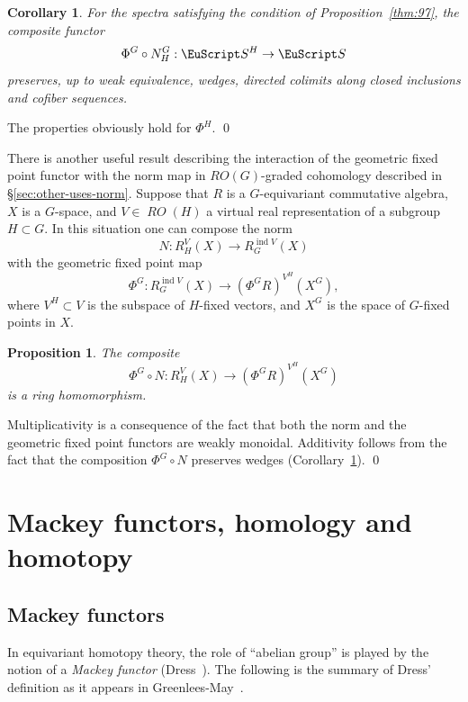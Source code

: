 \documentclass{amsart}
\newtheorem{cor}[equation]{Corollary}
\newtheorem{prop}[equation]{Proposition}
\theoremstyle{definition}
\theoremstyle{remark}
\newenvironment{pf}{\bigskip{\em Proof:\/}}{\qed\medskip}
\newcommand{\spectra}{\EuScript S}
\newcommand{\norm}{N}
\newcommand{\gfp}[1]{\Phi^{#1}}
\newcommand{\phig}{\gfp{G}}
\newcommand{\phih}{\gfp{H}}
\DeclareMathOperator{\ind}{ind}
\newcommand{\ugspectra}[1]{\spectra^{#1}}
\DeclareMathOperator{\RO}{\mathit {RO}}
\begin{document}
\begin{cor}
\label{thm:30} For the spectra satisfying the condition of
Proposition~\ref{thm:97}, the composite functor
\[
\phig\circ\norm_{H}^{G}:\ugspectra{H}\to \spectra
\]
preserves, up to weak equivalence, wedges, directed colimits along
closed inclusions and cofiber sequences.
\end{cor}

\begin{pf}
The properties obviously hold for $\phih$.
\end{pf}

There is another useful result describing the interaction of the
geometric fixed point functor with the norm map in $RO(G)$-graded
cohomology described in \S\ref{sec:other-uses-norm}.  Suppose that $R$
is a $G$-equivariant commutative algebra, $X$ is a $G$-space, and
$V\in\RO(H)$ a virtual real representation of a subgroup $H\subset G$.
In this situation one can compose the norm
\[
\norm: R^{V}_{H}(X) \to R^{\ind V}_{G}(X)
\]
with the geometric fixed point map
\[
\phig:R^{\ind V}_{G}(X) \to (\phig R)^{V^{H}}(X^{G}),
\]
where $V^{H}\subset V$ is the subspace of $H$-fixed vectors, and
$X^{G}$ is the space of $G$-fixed points in $X$.

\begin{prop}
\label{thm:125}
The composite
\[
\phig\circ \norm: R^{V}_{H}(X) \to (\phig R)^{V^{H}}(X^{G})
\]
is a ring homomorphism.
\end{prop}

\begin{pf}
Multiplicativity is a consequence of the fact that both the norm and
the geometric fixed point functors are weakly monoidal.   Additivity
follows from the fact that the composition $\phig\circ\norm$ preserves
wedges (Corollary~\ref{thm:30}).
\end{pf}

\section{Mackey functors, homology and homotopy}
\label{sec:mackey-functors}

\subsection{Mackey functors}
\label{sec:mackey-functors-1}

In equivariant homotopy theory, the role of ``abelian group'' is
played by the notion of a {\em Mackey functor}
(Dress~\cite{MR0384917}).  The following is the summary of Dress'
definition as it appears in Greenlees-May~\cite{MR1361893}.
\end{document}
